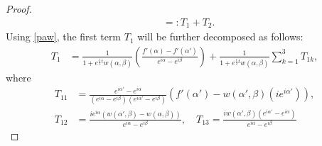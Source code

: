 \documentclass[11pt,reqno]{amsproc}
\begin{document}
\begin{proof}
\begin{align*}
        &=: T_1 + T_2.
    \end{align*}
    Using \eqref{paw}, the first term $T_1$ will be further decomposed as follows:
    \begin{align*}
        T_1 &= \frac{1}{1+ e^{\frac{i}{2}t}w(\alpha,\beta)}\left(\frac{f'(\alpha) - f'(\alpha')}{e^{i\alpha} - e^{i\beta}}\right) + \frac{1}{1+ e^{\frac{i}{2}t}w(\alpha,\beta)}\sum_{k=1}^3 T_{1k},
    \end{align*}
    where
    \begin{align*}
        T_{11} &=\frac{e^{i\alpha'} - e^{i\alpha}}{(e^{i\alpha} - e^{i\beta})(e^{i\alpha'} - e^{i\beta})}\left(f'(\alpha') - w(\alpha',\beta) (ie^{i\alpha'})\right),\\
        T_{12} &= \frac{ie^{i\alpha}(w(\alpha',\beta) - w(\alpha,\beta))}{e^{i\alpha}  -e^{i\beta}},\quad T_{13} = \frac{iw(\alpha',\beta)(e^{i\alpha'} - e^{i\alpha})}{e^{i\alpha}  -e^{i\beta}}
    \end{align*}
    
    
    

\end{proof}
\end{document}

